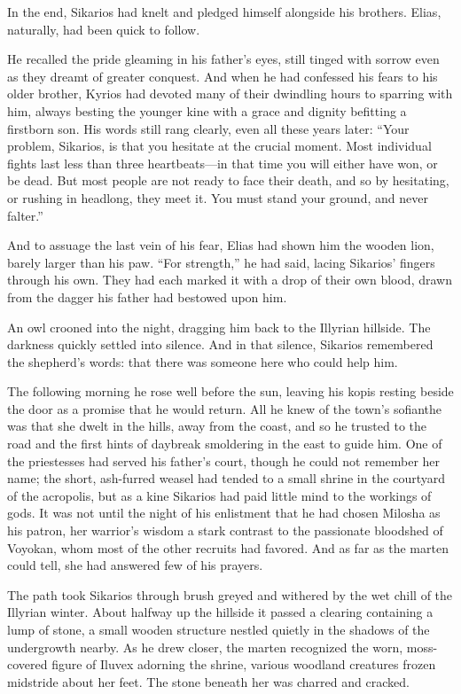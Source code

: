 In the end, Sikarios had knelt and pledged himself alongside his brothers. Elias, naturally, had been quick to follow.

He recalled the pride gleaming in his father's eyes, still tinged with sorrow even as they dreamt of greater conquest. And when he had confessed his fears to his older brother, Kyrios had devoted many of their dwindling hours to sparring with him, always besting the younger kine with a grace and dignity befitting a firstborn son. His words still rang clearly, even all these years later: ``Your problem, Sikarios, is that you hesitate at the crucial moment. Most individual fights last less than three heartbeats---in that time you will either have won, or be dead. But most people are not ready to face their death, and so by hesitating, or rushing in headlong, they meet it. You must stand your ground, and never falter.''

And to assuage the last vein of his fear, Elias had shown him the wooden lion, barely larger than his paw. ``For strength,'' he had said, lacing Sikarios' fingers through his own. They had each marked it with a drop of their own blood, drawn from the dagger his father had bestowed upon him.

An owl crooned into the night, dragging him back to the Illyrian hillside. The darkness quickly settled into silence. And in that silence, Sikarios remembered the shepherd's words: that there was someone here who could help him.

The following morning he rose well before the sun, leaving his kopis resting beside the door as a promise that he would return. All he knew of the town's sofianthe was that she dwelt in the hills, away from the coast, and so he trusted to the road and the first hints of daybreak smoldering in the east to guide him. One of the priestesses had served his father's court, though he could not remember her name; the short, ash-furred weasel had tended to a small shrine in the courtyard of the acropolis, but as a kine Sikarios had paid little mind to the workings of gods. It was not until the night of his enlistment that he had chosen Milosha as his patron, her warrior's wisdom a stark contrast to the passionate bloodshed of Voyokan, whom most of the other recruits had favored. And as far as the marten could tell, she had answered few of his prayers.

The path took Sikarios through brush greyed and withered by the wet chill of the Illyrian winter. About halfway up the hillside it passed a clearing containing a lump of stone, a small wooden structure nestled quietly in the shadows of the undergrowth nearby. As he drew closer, the marten recognized the worn, moss-covered figure of Iluvex adorning the shrine, various woodland creatures frozen midstride about her feet. The stone beneath her was charred and cracked.

